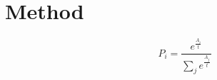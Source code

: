 \thispagestyle{empty}
\pagestyle{empty}
\section{Method}


\begin{equation}\label{eq:prob}
P_{i} = \frac{e^{\frac{A_i}{t}}}{\sum_{j}e^{\frac{A_j}{t}}}
\end{equation}




